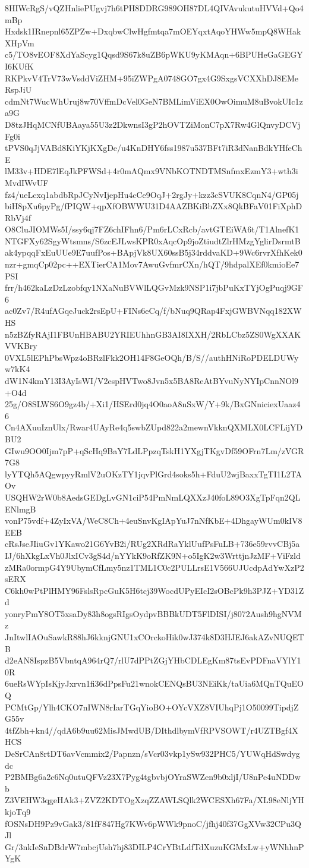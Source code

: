 8HIWcRgS/vQZHnliePUgvj7h6tPH8DDRG989OH87DL4QIVAvukutuHVVd+Qo4mBp
Hxdsk1IRnepnl65ZPZw+DxqbwClwHgfmtqa7mOEYqxtAqoYHWw5mpQ8WHakXHpVm
c5/TO8vEOF8XdYaScyg1Qqsd9S67k8uZB6pWKU9yKMAqn+6BPUHeGaGEGYI6KUfK
RKPkvV4TrV73wVsddViZHM+95iZWPgA0748GO7gx4G9SxgsVCXXhDJ8EMeRspJiU
cdmNt7WucWhUruj8w70VffmDcVel0GeN7BMLimViEX0OwOimuM8uBvokUIc1za9G
D8tzJHqMCNfUBAaya55U3z2DkwnsI3gP2hOVTZiMonC7pX7Rw4GlQnvyDCVjFg0i
tPVS0qJjVABd8KiYKjKXgDe/u4KnDHY6fss1987u537BFt7iR3dNanBdkYHfeChE
lM33v+HDE7lEqJkPFWSd+4r0mAQmx9VNbKOTNDTMSnfmxEzmY3+wth3iMvdIWvUF
fz4/ueLcxq1abdbRpJCyNvIjepHu4cCe9OqJ+2rgJy+kzz3cSVUK8CqnN4/GP05j
biH8pXu6pyPg/fPIQW+qpXfOBWWU31D4AAZBKiBbZXx8QkBFaV01FiXphDRbVj4f
O8CluJIOMWs5I/ssy6qj7FZ6chIFhn6/Pm6rLCxRcb/avtGTEiWA6t/T1AlnefK1
NTGFXy62SgyWtsmns/S6zcEJLwsKPR0xAqcOp9joZtiudtZlrHMzgYglirDsrmtB
ak4ypqqFxEuUUe9E7uufPos+BApjVk8UX60ssB5j34rddvaKD+9Wc6rvrXfhKek0
nzr+gmqCp02pc++EXTierCA1Mov7AwuGvfmrCXn/hQT/9hdpalXEf0kmioEe7PSI
frr/h462kaLzDzLzobfqy1NXaNuBVWlLQGvMzk9NSP1i7jbPuKxTYjOgPuqj9GF6
ac0Zv7/R4ufAGqeJuck2rsEpU+FINs6eCq/f/bNuq9QRap4FxjGWBVNqq182XWHS
n5zBZfyRAjI1FBUnHBABU2YRIEUhhnGB3AI8IXXH/2RbLCbz5ZS0WgXXAKVVKBry
0VXL5lEPhPbsWpz4oBRzlFkk2OH14F8GeOQh/B/S//authHNiRoPDELDUWyw7kK4
dW1N4kmY13I3AyIsWI/V2espHVTwo8Jvn5x5BA8ReAtBYvuNyNYIpCnnNOl9+O4d
25g/O8SLWS6O9gz4b/+Xi1/HSErd0jq4O0aoA8nSxW/Y+9k/BxGNniciexUaaz46
Cn4AXuuIznUlx/Rwar4UAyRe4q5swbZUpd822a2mewnVkknQXMLX0LCFLijYDBU2
GIwu9OO0Ijm7pP+qScHq9BaY7LdLPpzqTskH1YXgjTKgvDf59OFrn7Lm/zVGR7G8
lyYTQh5AQgwpyyRmlV2uOKzTY1jqvPlGrd4soks5h+FduU2wjBaxxTgTI1L2TAOv
USQHW2rW0b8AedsGEDgLvGN1ciP54PmNmLQXXzJ40foL89O3XgTpFqn2QLENlmgB
vonP75vdf+4ZyIxVA/WeC8Ch+4euSnvKgIApYuJ7nNfKbE+4DhgayWUm0kIV8EEB
cRsJseJIiuGv1YKawo21G6YvB2i/RUg2XRdRaYklUufPsFuLB+736e59rvvCBj5a
IJ/6hXkgLxVh0JlxICv3gS4d/nYYkK9oRfZK9N+o5IgK2w3WrttjnJzMF+ViFzld
zMRa0ormpG4Y9UbymCfLmy5nz1TML1C0c2PULLrsE1V566UJUcdpAdYwXzP2sERX
C6kh0wPtPlHMY96FslsRpcGuK5H6tcj39WocdUPyEIcI2sOBcPk9h3PJZ+YD31Zd
yonryPmY8OT5xsaDy83h8ogsRIgsOydpvBBBkUDT5FlDISI/j8072Aush9hgNVMz
JnItwlIAOuSawkR88hJ6kknjGNU1xCOrckoHik0wJ374k8D3HJEJ6akAZvNUQETB
d2eAN8IspzB5VbntqA964rQ7/rlU7dPPtZGjYHbCDLEgKm87tsEvPDFnaVYlY10R
6ueRsWYpIsKjyJxrvn1fi36dPpsFu21wnokCENQsBU3NEiKk/taUia6MQnTQuEOQ
PCMtGp/Ylh4CKO7nIWN8rIarTGqYioBO+OYcVXZ8VIUhqPj1O50099TipdjZG55v
4tfZbh+kn4//qdA6b9uu62MisJMwdUB/DIthdlbymVfRPVSOWT/r4UZTBgf4XHCS
DeSrCAn8rtDT6avVcmmix2/Papnzn/sVcr03vkp1ySw932PHC5/YUWqHdSwdygdc
P2BMBg6a2c6Nq0utuQFVz23X7Pyg4tgbvbjOYraSWZen9b0xljI/U8nPe4uNDDwb
Z3VEHW3qgeHAk3+ZVZ2KDTOgXzqZZAWLSQlk2WCESXh67Fa/XL98eNljYHkjoTq9
fOSNsDH9Pz9vGak3/81fF847Hg7KWv6pWWk9pnoC/jfhj40f37GgXVw32CPu3QJl
Gr/3nkIeSnDBdrW7mbcjUsh7hj83DILP4CrYBtLdfTdXuzuKGMxLw+yWNhhnPYgK
